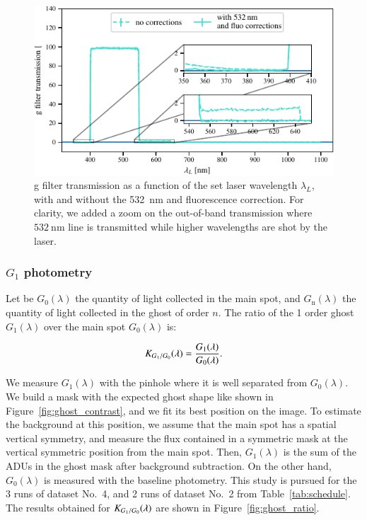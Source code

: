 \begin{figure}[h]
    \centering
    \includegraphics[width=\columnwidth]{fig/g_filter_532.pdf}
    \caption{\SD g filter transmission as a function of the set laser wavelength $\lambda_L$, with and without the \SI{532}{\nm} and fluorescence correction. For clarity, we added a zoom on the out-of-band transmission where $\SI{532}{\nm}$ line is transmitted while higher wavelengths are shot by the laser.}
    \label{fig:g_filter_532}
\end{figure}

\subsubsection{$G_1$ photometry}
\label{sec:ghost}

Let be $G_0(\lambda)$ the quantity of light collected in the main spot, and $G_\mathrm{n}(\lambda)$ the quantity of light collected in the ghost of order $n$. The ratio of the 1 order ghost $G_1(\lambda)$ over the main spot $G_0(\lambda)$ is:

\begin{equation}
    K_{G_1/G_0}(\lambda) = \frac{G_1(\lambda)}{G_0(\lambda)}.
    \label{eq:ratio_ghost}
\end{equation}

We measure $G_1(\lambda)$ with the \spinhole pinhole where it is well separated from $G_0(\lambda)$. We build a mask with the expected ghost shape like shown in Figure~\ref{fig:ghost_contrast}, and we fit its best position on the image. To estimate the background at this position, we assume that the main spot has a spatial vertical symmetry, and measure the flux contained in a symmetric mask at the vertical symmetric position from the main spot. Then, $G_1(\lambda)$ is the sum of the ADUs in the ghost mask after background subtraction. On the other hand, $G_0(\lambda)$ is measured with the baseline photometry. This study is pursued for the 3 runs of dataset No.~4, and 2 runs of dataset No.~2 from Table~\ref{tab:schedule}. The results obtained for $K_{G_1/G_0}(\lambda)$ are shown in Figure~\ref{fig:ghost_ratio}. 

